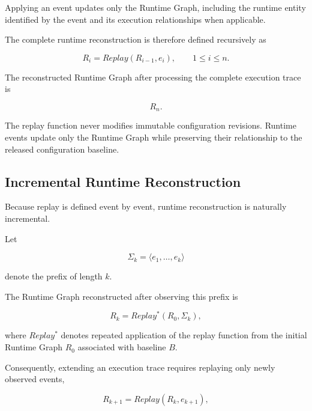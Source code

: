 \documentclass[10pt]{article}
\begin{document}
Applying an event updates only the Runtime Graph, including the runtime entity
identified by the event and its execution relationships when applicable.

The complete runtime reconstruction is therefore defined recursively as

\begin{equation}
R_i
=
Replay
(
R_{i-1},
e_i
),
\qquad
1\le i\le n.
\label{eq:runtime_replay_recursion}
\end{equation}

The reconstructed Runtime Graph after processing the complete execution trace is

\[
R_n.
\]

The replay function never modifies immutable configuration revisions. Runtime
events update only the Runtime Graph while preserving their relationship to the
released configuration baseline.

\subsection{Incremental Runtime Reconstruction}
\label{appendix:incremental_runtime_reconstruction}

Because replay is defined event by event, runtime reconstruction is naturally incremental.

Let

\begin{equation}
\Sigma_k
=
\langle
e_1,\ldots,e_k
\rangle
\label{eq:runtime_e1_ek}
\end{equation}

denote the prefix of length $k$.

The Runtime Graph reconstructed after observing this prefix is

\begin{equation}
	R_k
	=
	Replay^*
	(
	R_0,
	\Sigma_k
	),
	\label{eq:runtime_prefix_replay}
\end{equation}

where $Replay^*$ denotes repeated application of the replay function from the
initial Runtime Graph $R_0$ associated with baseline $B$.


Consequently, extending an execution trace requires replaying only newly observed events,

\begin{equation}
R_{k+1}
=
Replay(R_k,e_{k+1}),
\label{eq:runtime_incremental_replay}
\end{equation}
\end{document}
